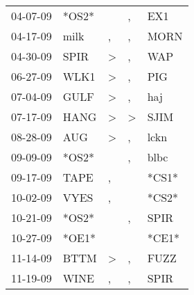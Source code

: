 \begin{supertabular}{p{0.07\textwidth}p{0.06\textwidth}p{0.02\textwidth}p{0.02\textwidth}p{0.06\textwidth}}
          04-07-09\textsuperscript{} &                            *OS2* &                  &                , &            EX1\textsuperscript{} \\
          04-17-09\textsuperscript{} &           milk\textsuperscript{} &                , &                , &           MORN\textsuperscript{} \\
          04-30-09\textsuperscript{} &           SPIR\textsuperscript{} &     \textgreater &                , &            WAP\textsuperscript{} \\
          06-27-09\textsuperscript{} &           WLK1\textsuperscript{} &     \textgreater &                , &            PIG\textsuperscript{} \\
          07-04-09\textsuperscript{} &           GULF\textsuperscript{} &     \textgreater &                , &            haj\textsuperscript{} \\
          07-17-09\textsuperscript{} &           HANG\textsuperscript{} &     \textgreater &     \textgreater &           SJIM\textsuperscript{} \\
          08-28-09\textsuperscript{} &            AUG\textsuperscript{} &     \textgreater &                , &           lckn\textsuperscript{} \\
          09-09-09\textsuperscript{} &                            *OS2* &                  &                , &           blbc\textsuperscript{} \\
          09-17-09\textsuperscript{} &           TAPE\textsuperscript{} &                , &                  &                            *CS1* \\
          10-02-09\textsuperscript{} &           VYES\textsuperscript{} &                , &                  &                            *CS2* \\
          10-21-09\textsuperscript{} &                            *OS2* &                  &                , &           SPIR\textsuperscript{} \\
          10-27-09\textsuperscript{} &                            *OE1* &                  &                  &                            *CE1* \\
          11-14-09\textsuperscript{} &           BTTM\textsuperscript{} &     \textgreater &                , &           FUZZ\textsuperscript{} \\
          11-19-09\textsuperscript{} &           WINE\textsuperscript{} &                , &                , &           SPIR\textsuperscript{} \\

\end{supertabular}

